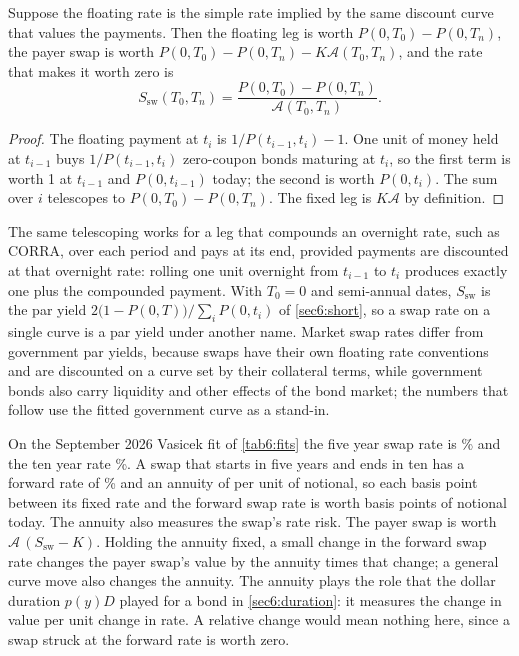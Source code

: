 \begin{chapterrefs}
\begin{proposition}\label{prop6:swaprate}
Suppose the floating rate is the simple rate implied by the same discount curve that values the
payments. Then the floating leg is worth $P(0,T_0)-P(0,T_n)$, the payer swap is worth
$P(0,T_0)-P(0,T_n)-K\mathcal A(T_0,T_n)$, and the rate that makes it worth zero is
\[
  S_{\mathrm{sw}}(T_0,T_n)=\frac{P(0,T_0)-P(0,T_n)}{\mathcal A(T_0,T_n)} .
\]
\end{proposition}

\begin{proof}
The floating payment at $t_i$ is $1/P(t_{i-1},t_i)-1$. One unit of money held at $t_{i-1}$ buys
$1/P(t_{i-1},t_i)$ zero-coupon bonds maturing at $t_i$, so the first term is worth 1 at $t_{i-1}$ and
$P(0,t_{i-1})$ today; the second is worth $P(0,t_i)$. The sum over $i$ telescopes to
$P(0,T_0)-P(0,T_n)$. The fixed leg is $K\mathcal A$ by definition.
\end{proof}

The same telescoping works for a leg that compounds an overnight rate, such as CORRA, over each
period and pays at its end, provided payments are discounted at that overnight rate: rolling one unit
overnight from $t_{i-1}$ to $t_i$ produces exactly one plus the compounded payment. With $T_0=0$ and
semi-annual dates, $S_{\mathrm{sw}}$ is the par yield $2\bigl(1-P(0,T)\bigr)/\sum_iP(0,t_i)$ of
\cref{sec6:short}, so a swap rate on a single curve is a par yield under another name. Market swap rates differ from government par yields, because swaps have their own floating rate
conventions and are discounted on a curve set by their collateral terms, while government bonds also
carry liquidity and other effects of the bond market; the numbers that follow use the fitted government curve as a stand-in.

On the September 2026 Vasicek fit of \cref{tab6:fits} the five year swap rate is \swFive\% and the
ten year rate \swTen\%. A swap that starts in five years and ends in ten has a forward rate of
\swFiveFive\% and an annuity of \swAnnFiveFive{} per unit of notional, so each basis point between
its fixed rate and the forward swap rate is worth \swAnnFiveFive{} basis points of notional today.
The annuity also measures the swap's rate risk. The payer swap is worth $\mathcal A\,(S_{\mathrm{sw}}-K)$. Holding the
annuity fixed, a small change in the forward swap rate changes the payer swap's value by the annuity
times that change; a general curve move also changes the annuity. The annuity plays the role that the
dollar duration $p(y)D$ played for a bond in \cref{sec6:duration}: it measures the change in value per
unit change in rate. A relative change would mean nothing here, since a swap struck at the forward rate
is worth zero.


\end{chapterrefs}
